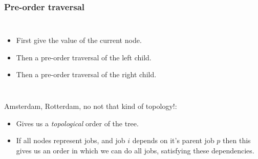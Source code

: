 \begin{frame}
	\frametitle{Pre-order traversal}
			\begin{columns}[T]
				\begin{itemize}
					\item First give the value of the current node.
					\item Then a pre-order traversal of the left child.
					\item Then a pre-order traversal of the right child.
				\end{itemize}
				
			\end{columns}

Amsterdam, Rotterdam, no not that kind of topology!:
				\begin{itemize}
					\item Gives us a \textit{topological} order of the tree.
					\item If all nodes represent jobs, and job $i$ depends on it's parent job $p$ then this gives us an order in which we can	do all jobs, satisfying these dependencies.
			\end{itemize}
\end{frame}

